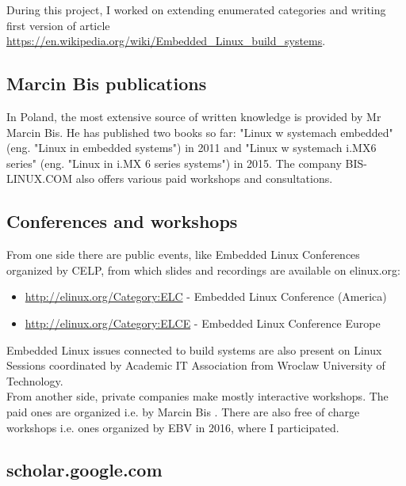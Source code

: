 \documentclass[printmode]{mgr}
\begin{document}
During this project, I worked on extending enumerated categories and writing first version of article \url{https://en.wikipedia.org/wiki/Embedded_Linux_build_systems}.



\subsection{Marcin Bis publications}

In Poland, the most extensive source of written knowledge is provided by Mr Marcin Bis.
He has published two books so far: "Linux w systemach embedded" (eng. "Linux in embedded systems") in 2011 and "Linux w systemach i.MX6 series" (eng. "Linux in i.MX 6 series systems") in 2015.
The company BIS-LINUX.COM also offers various paid workshops and consultations.

\subsection{Conferences and workshops}

From one side there are public events, like Embedded Linux Conferences organized by CELP, from which slides and recordings are available on elinux.org:

\begin{itemize}
  \item \url{http://elinux.org/Category:ELC} - Embedded Linux Conference (America)
  \item \url{http://elinux.org/Category:ELCE} - Embedded Linux Conference Europe
\end{itemize}

Embedded Linux issues connected to build systems are also present on Linux Sessions \cite{web:sesja-linuksowa} coordinated by Academic IT Association from Wroclaw University of Technology. \\

From another side, private companies make mostly interactive workshops. The paid ones are organized i.e. by Marcin Bis \cite{web:bis-szkolenia}. There are also free of charge workshops i.e. ones organized by EBV in 2016, where I participated.

\subsection{scholar.google.com}
\end{document}
